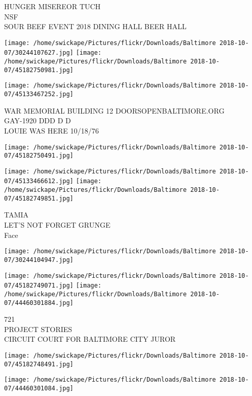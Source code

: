 \documentclass[10pt,letterpaper]{article}
\begin{document}
HUNGER MISEREOR TUCH\\
NSF\\
SOUR BEEF EVENT 2018 DINING HALL BEER HALL\\
\pagebreak

\texttt{[image: /home/swickape/Pictures/flickr/Downloads/Baltimore 2018-10-07/30244107627.jpg]}
\texttt{[image: /home/swickape/Pictures/flickr/Downloads/Baltimore 2018-10-07/45182750981.jpg]}

\texttt{[image: /home/swickape/Pictures/flickr/Downloads/Baltimore 2018-10-07/45133467252.jpg]}

WAR MEMORIAL BUILDING 12 DOORSOPENBALTIMORE.ORG\\
GAY{-}1920 DDD D D\\
LOUIE WAS HERE 10/18/76\\
\pagebreak

\texttt{[image: /home/swickape/Pictures/flickr/Downloads/Baltimore 2018-10-07/45182750491.jpg]}

\vspace{0.25in}
\texttt{[image: /home/swickape/Pictures/flickr/Downloads/Baltimore 2018-10-07/45133466612.jpg]}
\texttt{[image: /home/swickape/Pictures/flickr/Downloads/Baltimore 2018-10-07/45182749851.jpg]}

TAMIA\\
LET'S NOT FORGET GRUNGE\\
Face\\
\pagebreak

\texttt{[image: /home/swickape/Pictures/flickr/Downloads/Baltimore 2018-10-07/30244104947.jpg]}

\vspace{0.25in}
\texttt{[image: /home/swickape/Pictures/flickr/Downloads/Baltimore 2018-10-07/45182749071.jpg]}
\texttt{[image: /home/swickape/Pictures/flickr/Downloads/Baltimore 2018-10-07/44460301884.jpg]}

721\\
PROJECT STORIES\\
CIRCUIT COURT FOR BALTIMORE CITY JUROR\\
\pagebreak

\texttt{[image: /home/swickape/Pictures/flickr/Downloads/Baltimore 2018-10-07/45182748491.jpg]}

\vspace{0.25in}
\texttt{[image: /home/swickape/Pictures/flickr/Downloads/Baltimore 2018-10-07/44460301084.jpg]}
\end{document}
